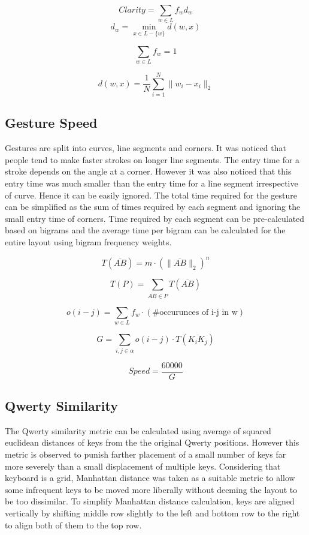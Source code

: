\documentclass[12pt]{article}
\begin{document}
\[Clarity=\sum_{w \in L} f_{w} d_{w}\]
 \[ d_{w}= \min_{x \in L - \{w\} } d(w,x) \] 

 \[ \sum_{w \in L } f_{w} = 1\]

 \[ d(w,x) = \frac{1}{N} \sum_{i=1}^{N} \| w_{i} - x_{i} \|_{2} \]


\subsection{Gesture Speed}
Gestures are split into curves, line segments and corners. It was noticed that people tend to make faster strokes on longer line segments. The entry time for a stroke depends on the angle at a corner. However it was also noticed that this entry time was much smaller than the entry time for a line segment irrespective of curve. Hence it can be easily ignored. 
The total time required for the gesture can be simplified as the sum of times required by each segment and ignoring the small entry time of corners. 
Time required by each segment can be pre-calculated based on bigrams and the average time per bigram can be calculated for the entire layout using bigram frequency weights.

\[ T( \overline{AB} )= m \cdot (\| \overline{AB} \|_{2})^n   \]

\[ T(P)= \sum_{\overline{AB} \in P} T(\overline{AB}) \]

\[ o(i-j)= \sum_{w \in L} f_{w} \cdot (\text {\# occurunces of i-j in w}) \]

\[ G = \sum_{i,j \in \alpha} o(i-j) \cdot T(\overline{K_{i}K_{j}}) \]

\[ Speed = \frac{60000}{G} \]

\subsection{Qwerty Similarity}
The Qwerty similarity metric can be calculated using average of squared euclidean distances of keys from the the original Qwerty positions. However this metric is observed to punish farther placement of a small number of keys far more severely than a small displacement of multiple keys. Considering that keyboard is a grid, Manhattan distance was taken as a suitable metric to allow some infrequent keys to be moved more liberally without deeming the layout to be too dissimilar. To simplify Manhattan distance calculation, keys are aligned vertically by shifting middle row slightly to the left and bottom row to the right to align both of them to the top row.
\end{document}
